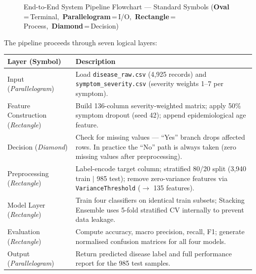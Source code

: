 \documentclass[12pt,a4paper]{article}
\begin{document}
\begin{figure}[H]
{%
}%
\caption{End-to-End System Pipeline Flowchart --- Standard Symbols
(\textbf{Oval}\,=\,Terminal,\ \textbf{Parallelogram}\,=\,I/O,\ \textbf{Rectangle}\,=\,Process,\ \textbf{Diamond}\,=\,Decision)}
\label{fig:pipeline}
\end{figure}

\noindent The pipeline proceeds through seven logical layers:

\begin{table}[H]
\centering
\small
\begin{tabular}{@{}p{3cm} p{10.5cm}@{}}
\toprule
\textbf{Layer (Symbol)} & \textbf{Description} \\
\midrule
Input (\textit{Parallelogram}) &
  Load \texttt{disease\_raw.csv} (4,925 records) and \texttt{symptom\_severity.csv}
  (severity weights 1--7 per symptom). \\[3pt]
Feature Construction (\textit{Rectangle}) &
  Build 136-column severity-weighted matrix; apply 50\% symptom dropout
  (seed 42); append epidemiological age feature. \\[3pt]
Decision (\textit{Diamond}) &
  Check for missing values --- ``Yes'' branch drops affected rows.
  In practice the ``No'' path is always taken (zero missing values after preprocessing). \\[3pt]
Preprocessing (\textit{Rectangle}) &
  Label-encode target column; stratified 80/20 split (3,940 train $|$ 985 test);
  remove zero-variance features via \texttt{VarianceThreshold} ($\to$ 135 features). \\[3pt]
Model Layer (\textit{Rectangle}) &
  Train four classifiers on identical train subsets; Stacking Ensemble uses
  5-fold stratified CV internally to prevent data leakage. \\[3pt]
Evaluation (\textit{Rectangle}) &
  Compute accuracy, macro precision, recall, F1; generate normalised
  confusion matrices for all four models. \\[3pt]
Output (\textit{Parallelogram}) &
  Return predicted disease label and full performance report for the 985 test samples. \\
\bottomrule
\end{tabular}
\end{table}
\end{document}
